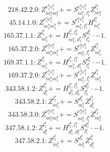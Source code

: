 \documentclass[letterpaper,10pt,fleqn,leqno,onecolumn]{article}
\begin{document}
\begin{equation} \;\;\;\;\;\;  218.42.2.0: Z^{e_{1}^{a}e_{1}^{b}}_{m_{1}^{a}m_{1}^{b}}+=S^{e_{1}^{a}e_{1}^{b}}_{m_{1}^{b},l_{1}^{a}}Z^{l_{1}^{a}}_{m_{1}^{a}} \end{equation}
\begin{equation} \;\;\;\;\;\;  45.14.1.0: Z^{e_{1}^{a}e_{1}^{b}}_{m_{1}^{a}m_{1}^{b}}+=S^{e_{1}^{a}e_{1}^{b}}_{m_{1}^{b},l_{1}^{a}}H^{l_{1}^{a}}_{m_{1}^{a}} \end{equation}
\begin{equation} \;\;\;\;\;\;  165.37.1.1: Z^{l_{1}^{b}}_{m_{1}^{b}}+=H^{l_{1}^{b},l_{2}^{b}}_{m_{1}^{b},d_{1}^{b}}S^{d_{1}^{b}}_{l_{2}^{b}}\cdot -1. \end{equation}
\begin{equation} \;\;\;\;\;\;  165.37.2.0: Z^{e_{1}^{a}e_{1}^{b}}_{m_{1}^{a}m_{1}^{b}}+=S^{e_{1}^{a}e_{1}^{b}}_{m_{1}^{a},l_{1}^{b}}Z^{l_{1}^{b}}_{m_{1}^{b}} \end{equation}
\begin{equation} \;\;\;\;\;\;  169.37.1.1: Z^{l_{1}^{b}}_{m_{1}^{b}}+=H^{l_{1}^{b},l_{1}^{a}}_{m_{1}^{b},d_{1}^{a}}S^{d_{1}^{a}}_{l_{1}^{a}}\cdot -1. \end{equation}
\begin{equation} \;\;\;\;\;\;  169.37.2.0: Z^{e_{1}^{a}e_{1}^{b}}_{m_{1}^{a}m_{1}^{b}}+=S^{e_{1}^{a}e_{1}^{b}}_{m_{1}^{a},l_{1}^{b}}Z^{l_{1}^{b}}_{m_{1}^{b}} \end{equation}
\begin{equation} \;\;\;\;\;\;  343.58.1.2: Z^{l_{1}^{b}}_{d_{1}^{b}}+=H^{l_{1}^{b},l_{2}^{b}}_{d_{1}^{b},d_{2}^{b}}S^{d_{2}^{b}}_{l_{2}^{b}}\cdot -1. \end{equation}
\begin{equation} \;\;\;\;\;\;  343.58.2.1: Z^{l_{1}^{b}}_{m_{1}^{b}}+=S^{d_{1}^{b}}_{m_{1}^{b}}Z^{l_{1}^{b}}_{d_{1}^{b}} \end{equation}
\begin{equation} \;\;\;\;\;\;  343.58.3.0: Z^{e_{1}^{a}e_{1}^{b}}_{m_{1}^{a}m_{1}^{b}}+=S^{e_{1}^{a}e_{1}^{b}}_{m_{1}^{a},l_{1}^{b}}Z^{l_{1}^{b}}_{m_{1}^{b}} \end{equation}
\begin{equation} \;\;\;\;\;\;  347.58.1.2: Z^{l_{1}^{b}}_{d_{1}^{b}}+=H^{l_{1}^{b},l_{1}^{a}}_{d_{1}^{b},d_{1}^{a}}S^{d_{1}^{a}}_{l_{1}^{a}}\cdot -1. \end{equation}
\begin{equation} \;\;\;\;\;\;  347.58.2.1: Z^{l_{1}^{b}}_{m_{1}^{b}}+=S^{d_{1}^{b}}_{m_{1}^{b}}Z^{l_{1}^{b}}_{d_{1}^{b}} \end{equation}
\end{document}
